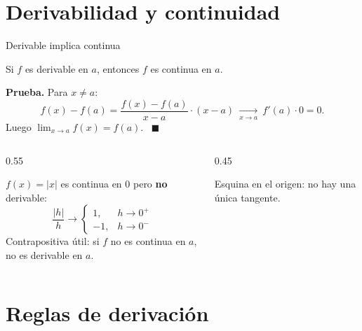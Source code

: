 \documentclass[10pt,aspectratio=169]{beamer}
\begin{document}
\section{Derivabilidad y continuidad}

\begin{frame}{Derivable implica continua}
  \begin{teorema}
    Si $f$ es derivable en $a$, entonces $f$ es continua en $a$.
  \end{teorema}
  \textbf{Prueba.} Para $x\neq a$:
  \[ f(x)-f(a)=\frac{f(x)-f(a)}{x-a}\cdot(x-a)\ \xrightarrow[x\to a]{}\ f'(a)\cdot0=0. \]
  Luego $\lim_{x\to a}f(x)=f(a)$. \ $\blacksquare$
  \begin{columns}
    \begin{column}{0.55\textwidth}
      \begin{observacion}
        $f(x)=|x|$ es continua en $0$ pero \textbf{no} derivable:
        \[ \frac{|h|}{h}\to\begin{cases}1,&h\to0^+\\-1,&h\to0^-\end{cases} \]
        Contrapositiva útil: si $f$ no es continua en $a$, no es derivable en $a$.
      \end{observacion}
    \end{column}
    \begin{column}{0.45\textwidth}
      \centering

      \small Esquina en el origen: no hay una única tangente.
    \end{column}
  \end{columns}
\end{frame}

\section{Reglas de derivación}
\end{document}
